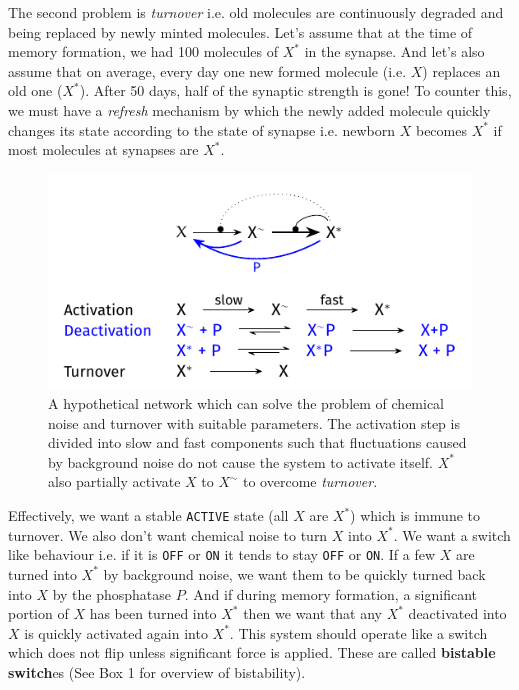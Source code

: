 \documentclass[]{resonance}
\begin{document}
The second problem is \textit{turnover} i.e. old molecules are continuously
degraded and being replaced by newly minted molecules. Let's assume that at the
time of memory formation, we had 100 molecules of $X^*$ in the synapse. And
let's also assume that on average, every day one new formed molecule (i.e. $X$)
replaces an old one ($X^*$).  After 50 days, half of the synaptic strength is
gone! To counter this, we must have a \textit{refresh} mechanism by which the
newly added molecule quickly changes its state according to the state of synapse
i.e. newborn $X$ becomes $X^*$ if most molecules at synapses are $X^*$.

\begin{figure}[b!]
\centering
\caption{A hypothetical network which can solve the problem of chemical noise and
    turnover with suitable parameters. The activation step is divided
    into slow and fast components such that fluctuations caused by background
    noise do not cause the system to activate itself. $X^*$ also partially activate
    $X$ to $X^\sim$ to overcome \textit{turnover.}
}\label{fig:model_bistable}
\includegraphics[width=\linewidth]{./fig_model_b.pdf}
\end{figure}

Effectively, we want a stable \texttt{ACTIVE} state (all $X$ are $X^*$) which is
immune to turnover. We also don't want chemical noise to turn $X$ into $X^*$.
We want a switch like behaviour i.e. if it is \texttt{OFF} or \texttt{ON} it
tends to stay \texttt{OFF} or \texttt{ON}. If a few $X$ are turned into $X^*$ by
background noise, we want them to be quickly turned back into $X$ by the
phosphatase $P$. And if during memory formation, a significant portion of $X$
has been turned into $X^*$ then we want that any $X^*$ deactivated into $X$ is
quickly activated again into $X^*$. This system should operate like a switch
which does not flip unless significant force is applied. These are called
\textbf{bistable switch}es (See Box 1 for overview of bistability). 
\end{document}
